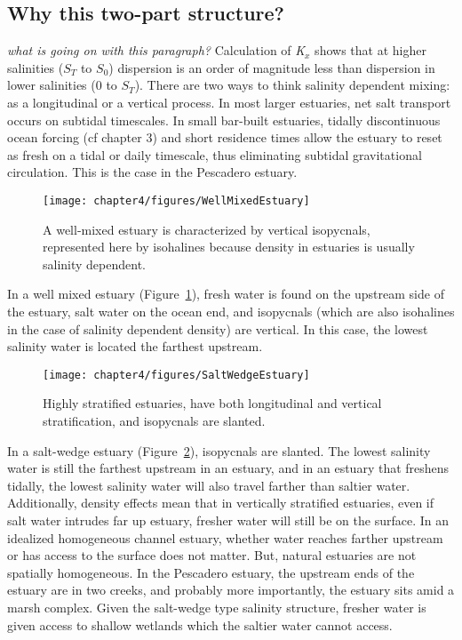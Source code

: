 \subsection{Why this two-part structure?}

\emph{what is going on with this paragraph?}
Calculation of \emph{K$_x$} shows that at higher salinities ($S_T$ to $S_0$) dispersion is an order of magnitude less than dispersion in lower salinities (0 to $S_T$). There are two ways to think salinity dependent mixing: as a longitudinal or a vertical process. In most larger estuaries, net salt transport occurs on subtidal timescales. In small bar-built estuaries, tidally discontinuous ocean forcing (cf chapter 3) and short residence times allow the estuary to reset as fresh on a tidal or daily timescale, thus eliminating subtidal gravitational circulation. This is the case in the Pescadero estuary.

\begin{figure}[h]
\centering
	\texttt{[image: chapter4/figures/WellMixedEstuary]}
	\caption{A well-mixed estuary is characterized by vertical isopycnals, represented here by isohalines because density in estuaries is usually salinity dependent.} \label{fig:WellMixedEstuary}
\end{figure}

In a well mixed estuary (Figure~\ref{fig:WellMixedEstuary}), fresh water is found on the upstream side of the estuary, salt water on the ocean end, and isopycnals (which are also isohalines in the case of salinity dependent density) are vertical. In this case, the lowest salinity water is located the farthest upstream. 

\begin{figure}[h]
\centering
	\texttt{[image: chapter4/figures/SaltWedgeEstuary]}
	\caption{Highly stratified estuaries, have both longitudinal and vertical stratification, and isopycnals are slanted.} \label{fig:SaltWedgeEstuary}
\end{figure}

In a salt-wedge estuary (Figure~\ref{fig:SaltWedgeEstuary}), isopycnals are slanted. The lowest salinity water is still the farthest upstream in an estuary, and in an estuary that freshens tidally, the lowest salinity water will also travel farther than saltier water. Additionally, density effects mean that in vertically stratified estuaries, even if salt water intrudes far up estuary, fresher water will still be on the surface. In an idealized homogeneous channel estuary, whether water reaches farther upstream or has access to the surface does not matter. But, natural estuaries are not spatially homogeneous. In the Pescadero estuary, the upstream ends of the estuary are in two creeks, and probably more importantly, the estuary sits amid a marsh complex. Given the salt-wedge type salinity structure, fresher water is given access to shallow wetlands which the saltier water cannot access. 

